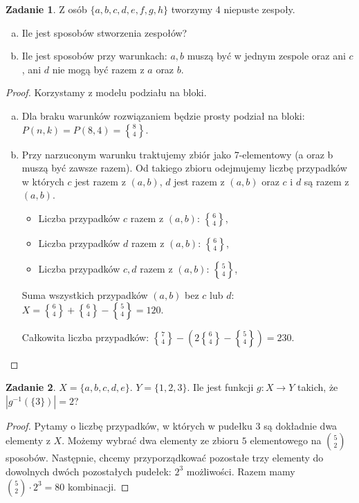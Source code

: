 \documentclass[11pt]{article}
\theoremstyle{definition}
\newtheorem{zadanie}{Zadanie}
\numberwithin{zadanie}{subsection}
\DeclareRobustCommand{\stirling}{\genfrac\{\}{0pt}{}}
\begin{document}
\begin{zadanie}
    Z osób $\{a,b,c,d,e,f,g,h\}$ tworzymy 4 niepuste zespoły.

    \begin{enumerate}[a)]
        \item Ile jest sposobów stworzenia zespołów?
        \item Ile jest sposobów przy warunkach: $a,b$ muszą być w jednym zespole oraz ani $c$, ani $d$ nie mogą być razem z $a$ oraz $b$.
    \end{enumerate}
\end{zadanie}
\begin{proof}
    Korzystamy z modelu podziału na bloki.
    \begin{enumerate}[a)]
        \item Dla braku warunków rozwiązaniem będzie prosty podział na bloki: $P(n,k) = P(8,4) = \stirling 84$.
        \item Przy narzuconym warunku traktujemy zbiór jako 7-elementowy (a oraz b muszą być zawsze razem). Od takiego zbioru odejmujemy liczbę przypadków w których $c$ jest razem z $(a,b)$, $d$ jest razem z $(a,b)$ oraz $c$ i $d$ są razem z $(a,b)$.

              \begin{itemize}
                  \item Liczba przypadków $c$ razem z $(a,b)$: $\stirling64$,
                  \item Liczba przypadków $d$ razem z $(a,b)$: $\stirling64$,
                  \item Liczba przypadków $c,d$ razem z $(a,b)$: $\stirling54$,
              \end{itemize}

              Suma wszystkich przypadków $(a,b)$ bez $c$ lub $d$: $X= \stirling64+\stirling64-\stirling54 = 120$.

              Całkowita liczba przypadków: $\stirling74 - ( 2\stirling64 - \stirling54 ) = 230.$
    \end{enumerate}
\end{proof}

\begin{zadanie}
    $X=\{a,b,c,d,e\}$. $Y=\{1,2,3\}$. Ile jest funkcji $g: X\to Y$ takich, że $|g^{-1}(\{3\})| = 2$?
\end{zadanie}
\begin{proof}
    Pytamy o liczbę przypadków, w których w pudełku $3$ są dokładnie dwa elementy z $X$. Możemy wybrać dwa elementy ze zbioru $5$ elementowego na $\binom52$ sposobów. Następnie, chcemy przyporządkować pozostałe trzy elementy do dowolnych dwóch pozostałych pudełek: $2^3$ możliwości. Razem mamy $\binom52\cdot2^3 = 80$ kombinacji.
\end{proof}
\end{document}
